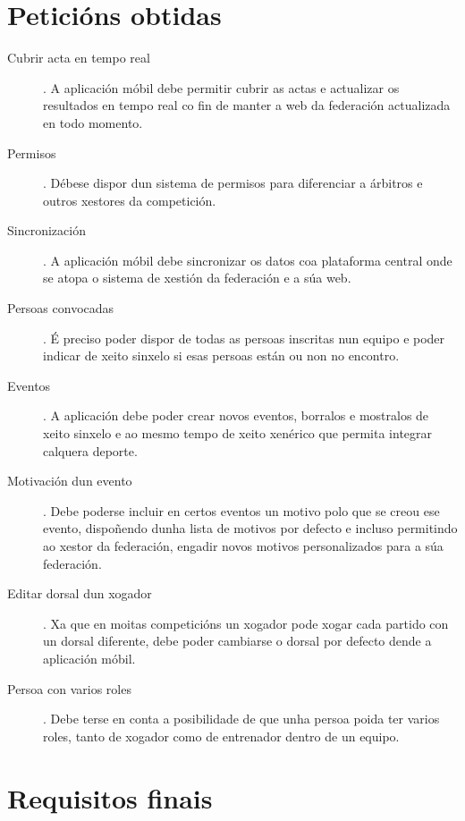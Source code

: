  \section{Peticións obtidas}
  \label{sec:analisis:obtido}
    \begin{description}
     \item [Cubrir acta en tempo real]. A aplicación móbil debe permitir cubrir 
as actas e actualizar os resultados en tempo real co fin de manter a web da 
federación actualizada en todo momento.

     \item [Permisos]. Débese dispor dun sistema de permisos para diferenciar a 
árbitros e outros xestores da competición.

     \item [Sincronización]. A aplicación móbil debe sincronizar os datos coa 
plataforma central onde se atopa o sistema de xestión da federación e a súa web.

     \item [Persoas convocadas]. É preciso poder dispor de todas as persoas 
inscritas nun equipo e poder indicar de xeito sinxelo si esas persoas están ou 
non no encontro.

     \item [Eventos]. A aplicación debe poder crear novos eventos, borralos e 
mostralos de xeito sinxelo e ao mesmo tempo de xeito xenérico que permita 
integrar calquera deporte.

     \item [Motivación dun evento]. Debe poderse incluir en certos eventos un 
motivo polo que se creou ese evento, dispoñendo dunha lista de motivos por 
defecto e incluso permitindo ao xestor da federación, engadir novos motivos 
personalizados para a súa federación.

     \item [Editar dorsal dun xogador]. Xa que en moitas competicións un 
xogador pode xogar cada partido con un dorsal diferente, debe poder cambiarse o 
dorsal por defecto dende a aplicación móbil.

     \item [Persoa con varios roles]. Debe terse en conta a posibilidade de que 
unha persoa poida ter varios roles, tanto de xogador como de entrenador dentro 
de un equipo.

    \end{description}

  \section{Requisitos finais}
  \label{sec:analisis:requisitos}
